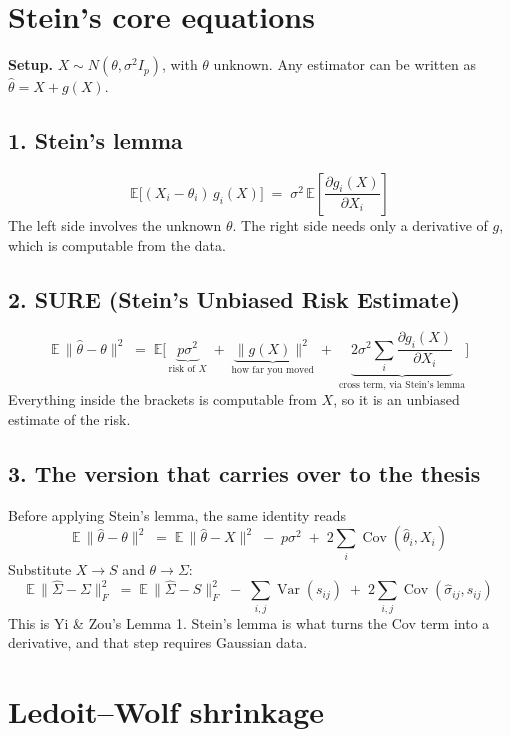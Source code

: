 \documentclass[12pt]{article}
\begin{document}
\section*{Stein's core equations}

\textbf{Setup.} $X \sim N(\theta, \sigma^2 I_p)$, with $\theta$ unknown. Any estimator can be written as $\hat\theta = X + g(X)$.

\subsection*{1. Stein's lemma}
\[
\mathbb{E}\big[(X_i-\theta_i)\,g_i(X)\big] \;=\; \sigma^2\,\mathbb{E}\!\left[\frac{\partial g_i(X)}{\partial X_i}\right]
\]
The left side involves the unknown $\theta$. The right side needs only a derivative of $g$, which is computable from the data.

\subsection*{2. SURE (Stein's Unbiased Risk Estimate)}
\[
\mathbb{E}\,\|\hat\theta-\theta\|^2 \;=\; \mathbb{E}\Big[\,
\underbrace{p\sigma^2}_{\text{risk of } X}
\;+\; \underbrace{\|g(X)\|^2}_{\text{how far you moved}}
\;+\; \underbrace{2\sigma^2 \sum_i \frac{\partial g_i(X)}{\partial X_i}}_{\text{cross term, via Stein's lemma}}
\Big]
\]
Everything inside the brackets is computable from $X$, so it is an unbiased estimate of the risk.

\subsection*{3. The version that carries over to the thesis}
Before applying Stein's lemma, the same identity reads
\[
\mathbb{E}\,\|\hat\theta-\theta\|^2 \;=\; \mathbb{E}\,\|\hat\theta - X\|^2 \;-\; p\sigma^2 \;+\; 2\sum_i \operatorname{Cov}(\hat\theta_i, X_i)
\]
Substitute $X \to S$ and $\theta \to \Sigma$:
\[
\mathbb{E}\,\|\hat\Sigma-\Sigma\|_F^2 \;=\; \mathbb{E}\,\|\hat\Sigma - S\|_F^2 \;-\; \sum_{i,j}\operatorname{Var}(s_{ij}) \;+\; 2\sum_{i,j} \operatorname{Cov}(\hat\sigma_{ij}, s_{ij})
\]
This is Yi \& Zou's Lemma 1. Stein's lemma is what turns the Cov term into a derivative, and that step requires Gaussian data.

\newpage
\section*{Ledoit--Wolf shrinkage}
\end{document}
